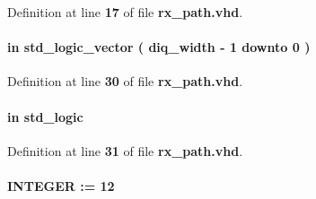 Definition at line {\bf 17} of file {\bf rx\+\_\+path.\+vhd}.

\paragraph[{D\+I\+Q2}]{ {\bfseries \textcolor{keywordflow}{in}\textcolor{vhdlchar}{ }} {\bfseries \textcolor{comment}{std\+\_\+logic\+\_\+vector}\textcolor{vhdlchar}{ }\textcolor{vhdlchar}{(}\textcolor{vhdlchar}{ }\textcolor{vhdlchar}{ }\textcolor{vhdlchar}{ }\textcolor{vhdlchar}{ }{\bfseries {\bf diq\+\_\+width}} \textcolor{vhdlchar}{-\/}\textcolor{vhdlchar}{ } \textcolor{vhdldigit}{1} \textcolor{vhdlchar}{ }\textcolor{keywordflow}{downto}\textcolor{vhdlchar}{ }\textcolor{vhdlchar}{ } \textcolor{vhdldigit}{0} \textcolor{vhdlchar}{ }\textcolor{vhdlchar}{)}\textcolor{vhdlchar}{ }} \hspace{0.3cm}{\ttfamily [Port]}}\label{classrx__path_a3a74d8e35942532e5f78504d309c05ed}


Definition at line {\bf 30} of file {\bf rx\+\_\+path.\+vhd}.

\paragraph[{D\+I\+Q2\+\_\+\+I\+Q\+S\+E\+L2}]{ {\bfseries \textcolor{keywordflow}{in}\textcolor{vhdlchar}{ }} {\bfseries \textcolor{comment}{std\+\_\+logic}\textcolor{vhdlchar}{ }} \hspace{0.3cm}{\ttfamily [Port]}}\label{classrx__path_a288f78c2f41173fc9bb914fe46366927}


Definition at line {\bf 31} of file {\bf rx\+\_\+path.\+vhd}.

\paragraph[{diq\+\_\+width}]{ {\bfseries \textcolor{vhdlchar}{ }} {\bfseries \textcolor{comment}{I\+N\+T\+E\+G\+ER}\textcolor{vhdlchar}{ }\textcolor{vhdlchar}{ }\textcolor{vhdlchar}{\+:}\textcolor{vhdlchar}{=}\textcolor{vhdlchar}{ }\textcolor{vhdlchar}{ } \textcolor{vhdldigit}{12} \textcolor{vhdlchar}{ }} \hspace{0.3cm}{\ttfamily [Generic]}}\label{classrx__path_a8f3619ae7c086284f10438374906f9a8}


